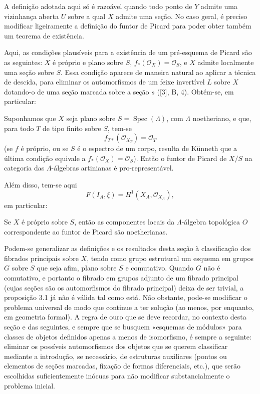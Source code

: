  A definição adotada aqui só é razoável quando
todo ponto de $Y$ admite uma vizinhança
aberta $U$ sobre a qual $X$ admite uma seção. No caso geral, é preciso
modificar ligeiramente a definição do funtor de Picard para poder obter
também um teorema de existência.

Aqui, as condições plausíveis para a existência de um pré-esquema de Picard
são as seguintes: $X$ é próprio e plano sobre $S$,
$f_*(\mathcal O_X)=\mathcal O_S$, e $X$ admite localmente uma seção sobre
$S$. Essa condição aparece de maneira natural ao aplicar a técnica de
descida, para eliminar os automorfismos de um feixe invertível $L$ sobre $X$
dotando-o de uma seção marcada sobre a seção $s$ ([3], B, 4). Obtém-se,
em particular:

 Suponhamos que $X$ seja plano sobre
$S=\operatorname{Spec}(\Lambda)$, com $\Lambda$ noetheriano, e que, para todo
$T$ de tipo finito sobre $S$, tem-se
\[
  f_{T*}(\mathcal O_{X_T})=\mathcal O_T
\]
(se $f$ é próprio, ou se $S$ é o espectro
de um corpo, resulta de Künneth que a última condição equivale a
$f_*(\mathcal O_X)=\mathcal O_S$). Então o funtor de Picard de $X/S$ na
categoria das $\Lambda$-álgebras artinianas é pro-representável.

Além disso, tem-se aqui
\[
  F(I_A,\xi)=H^1(X_A,\mathcal O_{X_A}),
\]
em particular:

 Se $X$ é próprio sobre $S$, então as componentes
locais da $\Lambda$-álgebra topológica $O$ correspondente ao funtor de
Picard são noetherianas.

 Podem-se generalizar as definições e os resultados
desta seção à classificação dos fibrados principais sobre $X$, tendo como
grupo estrutural um esquema em grupos $G$ sobre $S$ que seja afim, plano sobre
$S$ e comutativo. Quando $G$ não é comutativo, e portanto o fibrado em
grupos adjunto de um fibrado principal (cujas seções são os automorfismos
do fibrado principal) deixa de ser trivial, a proposição 3.1 já não é válida
tal como está. Não obstante, pode-se modificar o problema universal de modo que
continue a ter solução (ao menos, por enquanto, em geometria formal). A regra de
ouro que se deve recordar, no contexto desta seção e das
seguintes, e sempre que se busquem «esquemas de módulos» para classes de
objetos definidos apenas a menos de isomorfismo, é sempre a seguinte: eliminar
os possíveis automorfismos dos objetos que se querem classificar mediante
a introdução, se necessário, de estruturas auxiliares (pontos ou
elementos de seções marcadas, fixação de formas diferenciais, etc.), que
serão escolhidas suficientemente inócuas para não modificar substancialmente o
problema inicial.

